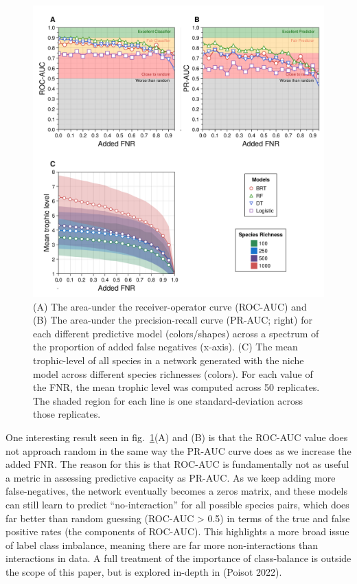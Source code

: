 \documentclass[11pt]{article}
\makeatletter
\def\maxwidth{\ifdim\Gin@nat@width>\linewidth\linewidth
\else\Gin@nat@width\fi}
\let\Oldincludegraphics\includegraphics
\renewcommand{\includegraphics}[1]{\Oldincludegraphics[width=\maxwidth]{#1}}
\makeatother
\begin{document}
\begin{figure}
\hypertarget{fig:addedfnr}{%
\centering
\includegraphics{./figures/fig3.png}
\caption{(A) The area-under the receiver-operator curve (ROC-AUC) and
(B) The area-under the precision-recall curve (PR-AUC; right) for each
different predictive model (colors/shapes) across a spectrum of the
proportion of added false negatives (x-axis). (C) The mean trophic-level
of all species in a network generated with the niche model across
different species richnesses (colors). For each value of the FNR, the
mean trophic level was computed across 50 replicates. The shaded region
for each line is one standard-deviation across those
replicates.}\label{fig:addedfnr}
}
\end{figure}

One interesting result seen in fig.~\ref{fig:addedfnr}(A) and (B) is
that the ROC-AUC value does not approach random in the same way the
PR-AUC curve does as we increase the added FNR. The reason for this is
that ROC-AUC is fundamentally not as useful a metric in assessing
predictive capacity as PR-AUC. As we keep adding more false-negatives,
the network eventually becomes a zeros matrix, and these models can
still learn to predict ``no-interaction'' for all possible species
pairs, which does far better than random guessing (ROC-AUC
\textgreater{} 0.5) in terms of the true and false positive rates (the
components of ROC-AUC). This highlights a more broad issue of label
class imbalance, meaning there are far more non-interactions than
interactions in data. A full treatment of the importance of
class-balance is outside the scope of this paper, but is explored
in-depth in (Poisot 2022).
\end{document}
